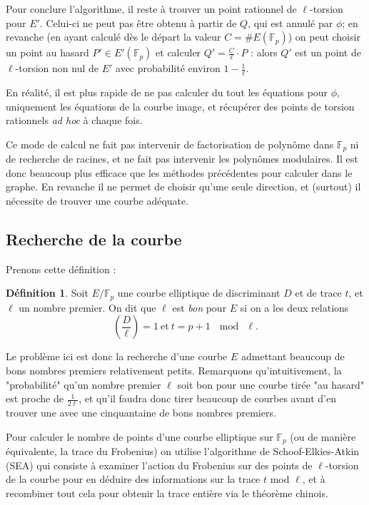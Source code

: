 \documentclass[11pt,a4paper]{article}
\newcommand{\F}{\mathbb{F}}
\theoremstyle{definition}
\newtheorem*{defi}{Définition}
\begin{document}
Pour conclure l'algorithme, il reste à trouver un point rationnel de $\ell$-torsion pour $E'$. Celui-ci ne peut pas être obtenu à partir de $Q$, qui est annulé par $\phi$; en revanche (en ayant calculé dès le départ la valeur $C=\#E(\F_p)$) on peut choisir un point au hasard $P'\in E'(\F_p)$ et calculer $Q'=\frac{C}{\ell}\cdot P$ : alors $Q'$ est un point de $\ell$-torsion non nul de $E'$ avec probabilité environ $1-\frac{1}{\ell}$.

En réalité, il est plus rapide de ne pas calculer du tout les équations pour $\phi$, uniquement les équations de la courbe image, et récupérer des points de torsion rationnels \emph{ad hoc} à chaque fois.

Ce mode de calcul ne fait pas intervenir de factorisation de polynôme dans $\F_p$ ni de recherche de racines, et ne fait pas intervenir les polynômes modulaires. Il est donc beaucoup plus efficace que les méthodes précédentes pour calculer dans le graphe. En revanche il ne permet de choisir qu'une seule direction, et (surtout) il nécessite de trouver une courbe adéquate.


\newpage

\subsection{Recherche de la courbe}

Prenons cette définition :

\begin{defi}
Soit $E/\F_p$ une courbe elliptique de discriminant $D$ et de trace $t$, et $\ell$ un nombre premier. On dit que $\ell$ est \emph{bon} pour $E$ si on a les deux relations
$$ \left(\frac{D}{\ell}\right)=1\ \text{et}\ t=p+1\ \mod\ \ell.$$
\end{defi}

Le problème ici est donc la recherche d'une courbe $E$ admettant beaucoup de bons nombres premiers relativement petits. Remarquons qu'intuitivement, la "probabilité" qu'un nombre premier $\ell$ soit bon pour une courbe tirée "au hasard" est proche de $\frac{1}{2\ell}$, et qu'il faudra donc tirer beaucoup de courbes avant d'en trouver une avec une cinquantaine de bons nombres premiers.

Pour calculer le nombre de points d'une courbe elliptique sur $\F_p$ (ou de manière équivalente, la trace du Frobenius) on utilise l'algorithme de Schoof-Elkies-Atkin (SEA) qui consiste à examiner l'action du Frobenius sur des points de $\ell$-torsion de la courbe pour en déduire des informations sur la trace $t$ mod $\ell$, et à recombiner tout cela pour obtenir la trace entière via le théorème chinois.
\end{document}
